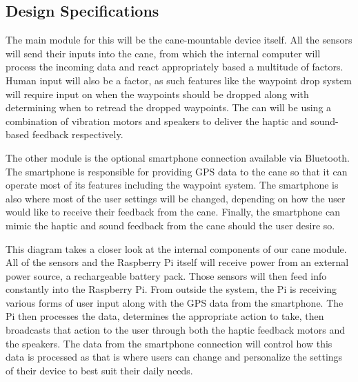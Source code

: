 \documentclass[letterpaper,12pt]{article}
\begin{document}
\clearpage\subsection{Design Specifications}


\medskip

The main module for this will be the cane-mountable device itself. All the sensors will send their inputs into the cane, from which the internal computer will process the incoming data and react appropriately based a multitude of factors. Human input will also be a factor, as such features like the waypoint drop system will require input on when the waypoints should be dropped along with determining when to retread the dropped waypoints. The can will be using a combination of vibration motors and speakers to deliver the haptic and sound-based feedback respectively. \par
The other module is the optional smartphone connection available via Bluetooth. The smartphone is responsible for providing GPS data to the cane so that it can operate most of its features including the waypoint system. The smartphone is also where most of the user settings will be changed, depending on how the user would like to receive their feedback from the cane. Finally, the smartphone can mimic the haptic and sound feedback from the cane should the user desire so. \par


\medskip

This diagram takes a closer look at the internal components of our cane module. All of the sensors and the Raspberry Pi itself will receive power from an external power source, a rechargeable battery pack. Those sensors will then feed info constantly into the Raspberry Pi. From outside the system, the Pi is receiving various forms of user input along with the GPS data from the smartphone. The Pi then processes the data, determines the appropriate action to take, then broadcasts that action to the user through both the haptic feedback motors and the speakers. The data from the smartphone connection will control how this data is processed as that is where users can change and personalize the settings of their device to best suit their daily needs. \par
\end{document}

